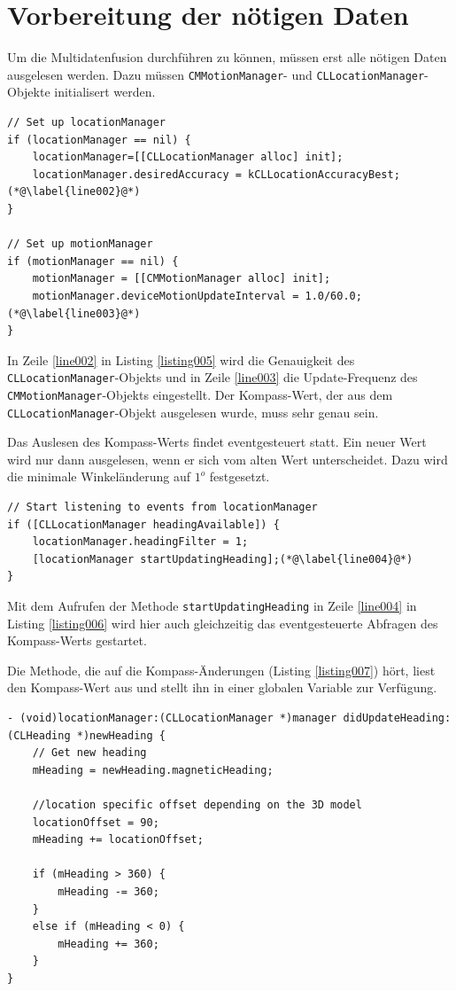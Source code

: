 \section{Vorbereitung der nötigen Daten}
Um die Multidatenfusion durchführen zu können, müssen erst alle nötigen Daten ausgelesen werden. Dazu müssen \texttt{CMMotionManager}- und \texttt{CLLocationManager}-Objekte initialisert werden.  \cite{book001} \cite{book002} 
~\\
\begin{lstlisting}[float=htb, caption=\texttt{locationManager} und \texttt{motionManager} initialisieren \cite{apple:003}, label=listing005]
// Set up locationManager
if (locationManager == nil) {
	locationManager=[[CLLocationManager alloc] init];
	locationManager.desiredAccuracy = kCLLocationAccuracyBest;(*@\label{line002}@*)
}
    
// Set up motionManager    
if (motionManager == nil) {
	motionManager = [[CMMotionManager alloc] init];
	motionManager.deviceMotionUpdateInterval = 1.0/60.0;(*@\label{line003}@*)
}
\end{lstlisting}

In Zeile \ref{line002} in Listing \ref{listing005} wird die Genauigkeit des \texttt{CLLocationManager}-Objekts und in Zeile \ref{line003} die Update-Frequenz des \texttt{CMMotionManager}-Objekts eingestellt. Der Kompass-Wert, der aus dem \texttt{CLLocationManager}-Objekt ausgelesen wurde, muss sehr genau sein.

Das Auslesen des Kompass-Werts findet eventgesteuert statt. Ein neuer Wert wird nur dann ausgelesen, wenn er sich vom alten Wert unterscheidet. Dazu wird die minimale Winkeländerung auf $1^o$ festgesetzt.
~\\
\begin{lstlisting}[float=htb, caption=\texttt{locationManager} starten \cite{apple:003}, label=listing006]
// Start listening to events from locationManager
if ([CLLocationManager headingAvailable]) {
	locationManager.headingFilter = 1;
	[locationManager startUpdatingHeading];(*@\label{line004}@*)
}
\end{lstlisting}

Mit dem Aufrufen der Methode \texttt{startUpdatingHeading} in Zeile \ref{line004} in Listing \ref{listing006} wird hier auch gleichzeitig das eventgesteuerte Abfragen des Kompass-Werts gestartet.

Die Methode, die auf die Kompass-Änderungen (Listing \ref{listing007}) hört, liest den Kompass-Wert aus und stellt ihn in einer globalen Variable zur Verfügung.
~\\
\begin{lstlisting}[float=htb, caption=Azimut ermittelt durch Kompass, label=listing007]
- (void)locationManager:(CLLocationManager *)manager didUpdateHeading:(CLHeading *)newHeading {
	// Get new heading
	mHeading = newHeading.magneticHeading;    
    
	//location specific offset depending on the 3D model
	locationOffset = 90;
	mHeading += locationOffset;
    
	if (mHeading > 360) {
		mHeading -= 360;
	}
	else if (mHeading < 0) {
		mHeading += 360;
	}
}
\end{lstlisting}

